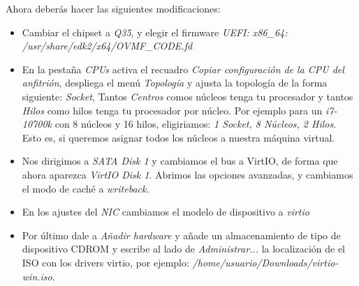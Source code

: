 \documentclass[12pt]{article}
\begin{document}
Ahora deberás hacer las siguientes modificaciones:

\begin{itemize}
\setlength\itemsep{-0.3em}
\item Cambiar el chipset a \emph{Q35}, y elegir el firmware \emph{UEFI: x86\_64: /usr/share/edk2/x64/OVMF\_CODE.fd}
\item En la pestaña \emph{CPUs} activa el recuadro \emph{Copiar configuración de la CPU del anfitrión}, despliega el menú \emph{Topología} y ajusta la topología de la forma siguiente:
 \emph{Socket}, Tantos \emph{Centros} comos núcleos tenga tu procesador y tantos \emph{Hilos} como hilos tenga tu procesador por núcleo. Por ejemplo para un \emph{i7-10700k} con 8 núcleos y 16 hilos, eligiriamos: \emph{1 Socket, 8 Núcleos, 2 Hilos}. Esto es, si queremos asignar todos los núcleos a nuestra máquina virtual.
\item Nos dirigimos a \emph{SATA Disk 1} y cambiamos el bus a VirtIO, de forma que ahora aparezca \emph{VirtIO Disk 1}. Abrimos las opciones avanzadas, y cambiamos el modo de caché a \emph{writeback}.
\item En los ajustes del \emph{NIC} cambiamos el modelo de dispositivo a \emph{virtio}
\item Por último dale a \emph{Añadir hardware} y añade un almacenamiento de tipo de dispositivo CDROM y escribe al lado de \emph{Administrar...} la localización de el ISO con los drivers virtio, por ejemplo: \emph{/home/usuario/Downloads/virtio-win.iso}.
\end{itemize}
\end{document}
